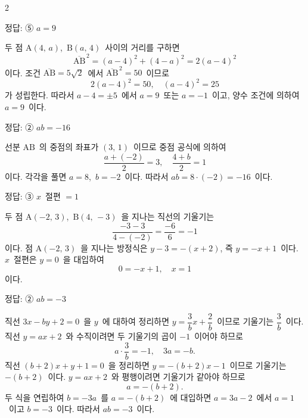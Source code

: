\documentclass[10pt,fleqn]{article}
\begin{document}
\begin{multicols*}{2}

\begin{dmanswerbox}
정답: ⑤ $a=9$
\end{dmanswerbox}

두 점 $\mathrm{A}(4,\, a)$,\ $\mathrm{B}(a,\, 4)$\ 사이의 거리를 구하면
\[ \overline{\mathrm{AB}}^{\,2} = (a-4)^2 + (4-a)^2 = 2(a-4)^2 \]
이다. 조건 $\overline{\mathrm{AB}}=5\sqrt{2}$\ 에서 $\overline{\mathrm{AB}}^{\,2}=50$\ 이므로
\[ 2(a-4)^2 = 50,\quad (a-4)^2 = 25 \]
가 성립한다. 따라서 $a-4=\pm 5$\ 에서 $a=9$\ 또는 $a=-1$\ 이고, 양수 조건에 의하여 $a=9$\ 이다.

\begin{dmanswerbox}
정답: ② $ab=-16$
\end{dmanswerbox}

선분 $\mathrm{AB}$\ 의 중점의 좌표가 $(3,\,1)$\ 이므로 중점 공식에 의하여
\[ \dfrac{a+(-2)}{2}=3,\quad \dfrac{4+b}{2}=1 \]
이다. 각각을 풀면 $a=8$,\ $b=-2$\ 이다. 따라서 $ab=8\cdot(-2)=-16$\ 이다.

\begin{dmanswerbox}
정답: ③ $x$\ 절편 $=1$
\end{dmanswerbox}

두 점 $\mathrm{A}(-2,\,3)$,\ $\mathrm{B}(4,\,-3)$\ 을 지나는 직선의 기울기는
\[ \dfrac{-3-3}{4-(-2)} = \dfrac{-6}{6} = -1 \]
이다. 점 $\mathrm{A}(-2,\,3)$\ 을 지나는 방정식은 $y-3=-(x+2)$, 즉 $y=-x+1$\ 이다. $x$\ 절편은 $y=0$\ 을 대입하여
\[ 0 = -x+1,\quad x=1 \]
이다.

\begin{dmanswerbox}
정답: ② $ab=-3$
\end{dmanswerbox}

직선 $3x-by+2=0$\ 을 $y$\ 에 대하여 정리하면 $y=\dfrac{3}{b}x+\dfrac{2}{b}$\ 이므로 기울기는 $\dfrac{3}{b}$\ 이다. 직선 $y=ax+2$\ 와 수직이려면 두 기울기의 곱이 $-1$\ 이어야 하므로
\[ a\cdot\dfrac{3}{b} = -1,\quad 3a=-b. \]
직선 $(b+2)x+y+1=0$\ 을 정리하면 $y=-(b+2)x-1$\ 이므로 기울기는 $-(b+2)$\ 이다. $y=ax+2$\ 와 평행이려면 기울기가 같아야 하므로
\[ a = -(b+2). \]
두 식을 연립하여 $b=-3a$\ 를 $a=-(b+2)$\ 에 대입하면 $a=3a-2$\ 에서 $a=1$\ 이고 $b=-3$\ 이다. 따라서 $ab=-3$\ 이다.


\end{multicols*}
\end{document}
